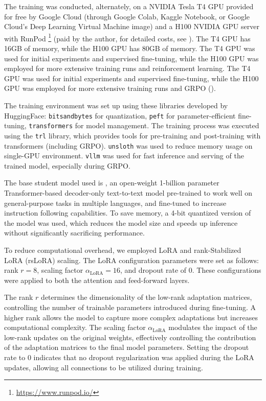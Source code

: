  \label{app:training-details}

The training was conducted, alternately, on a NVIDIA Tesla T4 GPU provided for free by Google Cloud (through Google Colab, Kaggle Notebook, or Google Cloud's Deep Learning Virtual Machine image) and a H100 NVIDIA GPU server with RunPod \footnote{\url{https://www.runpod.io/}} (paid by the author, for detailed costs, see ). The T4 GPU has 16GB of memory, while the H100 GPU has 80GB of memory. The T4 GPU was used for initial experiments and supervised fine-tuning, while the H100 GPU was employed for  more extensive training runs and reinforcement learning. The T4 GPU was used for initial experiments and supervised fine-tuning, while the H100 GPU was employed for more extensive training runs and GRPO ().

The training environment was set up using these libraries developed by HuggingFace: \verb|bitsandbytes| for quantization, \verb|peft| for parameter-efficient fine-tuning, \verb|transformers| for model management. The training process was executed using the \verb|trl| library, which provides tools for pre-training and post-training with transformers (including GRPO). \verb|unsloth| was used to reduce memory usage on single-GPU environment. \verb|vllm| was used for fast inference and serving of the trained model, especially during GRPO.

The base student model used is \studentmodel, an open-weight 1-billion parameter Transformer-based decoder-only text-to-text model pre-trained to work well on general-purpose tasks in multiple languages, and fine-tuned to increase instruction following capabilities. To save memory, a 4-bit quantized version of the model was used, which reduces the model size and speeds up inference without significantly sacrificing performance.

 \label{app:lora-config}

To reduce computational overhead, we employed LoRA \citep{huLoRALowRankAdaptation2021} and rank-Stabilized LoRA (rsLoRA) scaling. The LoRA configuration parameters were set as follows: rank \( r = 8 \), scaling factor \( \alpha_{\text{LoRA}} = 16 \), and dropout rate of 0. These configurations were applied to both the attention and feed-forward layers.

The rank \( r \) determines the dimensionality of the low-rank adaptation matrices, controlling the number of trainable parameters introduced during fine-tuning. A higher rank allows the model to capture more complex adaptations but increases computational complexity. The scaling factor \( \alpha_{\text{LoRA}} \) modulates the impact of the low-rank updates on the original weights, effectively controlling the contribution of the adaptation matrices to the final model parameters. Setting the dropout rate to 0 indicates that no dropout regularization was applied during the LoRA updates, allowing all connections to be utilized during training.


